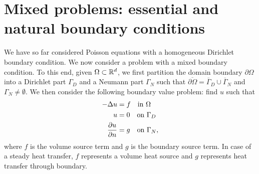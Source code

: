 \section{Mixed problems: essential and natural boundary conditions}
\label{sec:posnd_mixed}
We have so far considered Poisson equations with a homogeneous Dirichlet boundary condition.  We now consider a problem with a mixed boundary condition. To this end, given $\Omega \subset \mathbb{R}^d$, we first partition the domain boundary $\partial \Omega$ into a Dirichlet part $\Gamma_D$ and a Neumann part $\Gamma_N$ such that $\overline{\partial \Omega} = \overline \Gamma_D \cup \overline \Gamma_N$ and $\Gamma_N \neq \emptyset$.  We then consider the following boundary value problem: find $u$ such that
\begin{align}
  -\Delta u &= f \quad \text{in } \Omega \notag \\
  u &= 0 \quad \text{on } \Gamma_D \label{eq:posnd_mixed_bc_strong} \\
  \frac{\partial u}{\partial n} &= g \quad \text{on } \Gamma_N, \notag
\end{align}
where $f$ is the volume source term and $g$ is the boundary source term.  In case of a steady heat transfer, $f$ represents a volume heat source and $g$ represents heat transfer through boundary.

